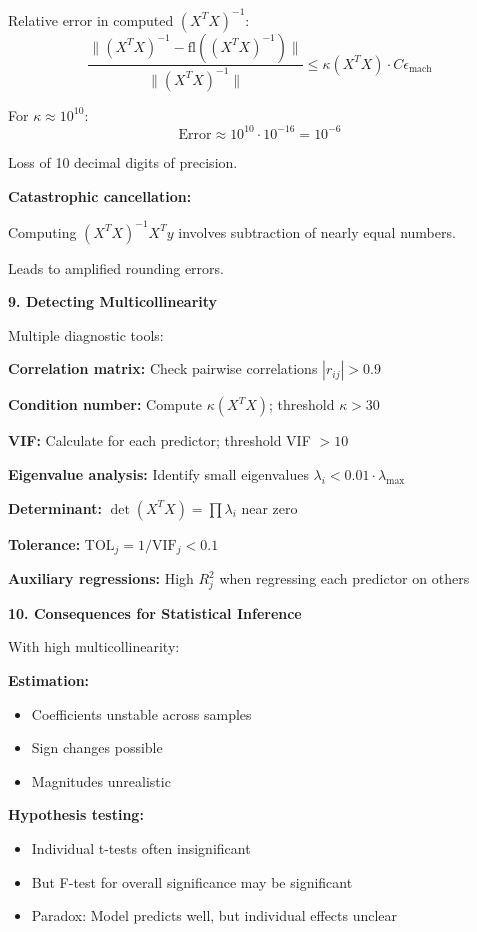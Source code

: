 \documentclass[12pt]{article}
\begin{document}
\begin{explanation}
Relative error in computed $(X^TX)^{-1}$:
\[\frac{\|(X^TX)^{-1} - \text{fl}((X^TX)^{-1})\|}{\|(X^TX)^{-1}\|} \leq \kappa(X^TX) \cdot C \epsilon_{\text{mach}}\]

For $\kappa \approx 10^{10}$:
\[\text{Error} \approx 10^{10} \cdot 10^{-16} = 10^{-6}\]

Loss of 10 decimal digits of precision.

\textbf{Catastrophic cancellation:}

Computing $(X^TX)^{-1}X^Ty$ involves subtraction of nearly equal numbers.

Leads to amplified rounding errors.

\textbf{9. Detecting Multicollinearity}

Multiple diagnostic tools:

\textbf{Correlation matrix:} Check pairwise correlations $|r_{ij}| > 0.9$

\textbf{Condition number:} Compute $\kappa(X^TX)$; threshold $\kappa > 30$

\textbf{VIF:} Calculate for each predictor; threshold VIF $> 10$

\textbf{Eigenvalue analysis:} Identify small eigenvalues $\lambda_i < 0.01 \cdot \lambda_{\max}$

\textbf{Determinant:} $\det(X^TX) = \prod \lambda_i$ near zero

\textbf{Tolerance:} $\text{TOL}_j = 1/\text{VIF}_j < 0.1$

\textbf{Auxiliary regressions:} High $R_j^2$ when regressing each predictor on others

\textbf{10. Consequences for Statistical Inference}

With high multicollinearity:

\textbf{Estimation:}
\begin{itemize}
\item Coefficients unstable across samples
\item Sign changes possible
\item Magnitudes unrealistic
\end{itemize}

\textbf{Hypothesis testing:}
\begin{itemize}
\item Individual t-tests often insignificant
\item But F-test for overall significance may be significant
\item Paradox: Model predicts well, but individual effects unclear
\end{itemize}


\end{explanation}
\end{document}
